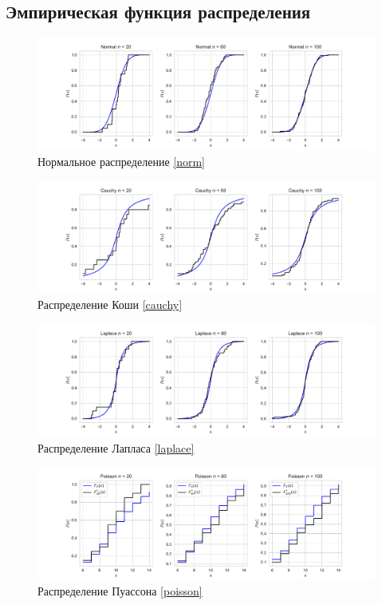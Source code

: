 \documentclass[a4paper]{article}
\begin{document}
\subsection{Эмпирическая функция распределения}
\begin{figure}[H]
    \centering
    \includegraphics[width = 16 cm]{sources/normalECDF.pdf}
    \caption{Нормальное распределение \eqref{norm}}
    \label{fig:normECDF}
\end{figure}
\begin{figure}[H]
    \centering
    \includegraphics[width = 16 cm]{sources/cauchyECDF.pdf}
    \caption{Распределение Коши \eqref{cauchy}}
    \label{fig:cauchyECDF}
\end{figure}
\begin{figure}[H]
    \centering
    \includegraphics[width = 16 cm]{sources/laplaceECDF.pdf}
    \caption{Распределение Лапласа \eqref{laplace}}
    \label{fig:laplaceECDF}
\end{figure}
\begin{figure}[H]
    \centering
    \includegraphics[width = 16 cm]{sources/poissonECDF.pdf}
    \caption{Распределение Пуассона \eqref{poisson}}
    \label{fig:poissonECDF}
\end{figure}
\end{document}
